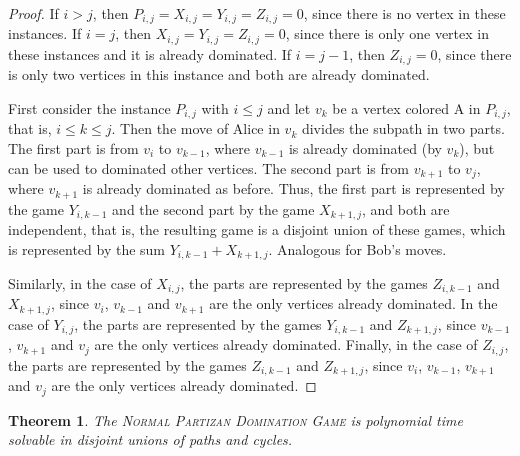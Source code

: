 \documentclass[12pt]{article}
\newtheorem{theorem}{Theorem}[section]
\begin{document}
\begin{proof}
If $i>j$, then $P_{i,j}=X_{i,j}=Y_{i,j}=Z_{i,j}=0$, since there is no vertex in these instances.
If $i=j$, then $X_{i,j}=Y_{i,j}=Z_{i,j}=0$, since there is only one vertex in these instances and it is already dominated.
If $i=j-1$, then $Z_{i,j}=0$, since there is only two vertices in this instance and both are already dominated.

First consider the instance $P_{i,j}$ with $i\leq j$ and let $v_k$ be a vertex colored A in $P_{i,j}$, that is, $i\leq k\leq j$. Then the move of Alice in $v_k$ divides the subpath in two parts. The first part is from $v_i$ to $v_{k-1}$, where $v_{k-1}$ is already dominated (by $v_k$), but can be used to dominated other vertices. The second part is from $v_{k+1}$ to $v_j$, where $v_{k+1}$ is already dominated as before. Thus, the first part is represented by the game $Y_{i,k-1}$ and the second part by the game $X_{k+1,j}$, and both are independent, that is, the resulting game is a disjoint union of these games, which is represented by the sum $Y_{i,k-1}+X_{k+1,j}$. Analogous for Bob's moves.

Similarly, in the case of $X_{i,j}$, the parts are represented by the games $Z_{i,k-1}$ and $X_{k+1,j}$, since $v_i$, $v_{k-1}$ and $v_{k+1}$ are the only vertices already dominated.
In the case of $Y_{i,j}$, the parts are represented by the games $Y_{i,k-1}$ and $Z_{k+1,j}$, since $v_{k-1}$, $v_{k+1}$ and $v_j$ are the only vertices already dominated.
Finally, in the case of $Z_{i,j}$, the parts are represented by the games $Z_{i,k-1}$ and $Z_{k+1,j}$, since $v_i$, $v_{k-1}$, $v_{k+1}$ and $v_j$ are the only vertices already dominated.
\end{proof}



\begin{theorem}
The \textsc{Normal Partizan Domination Game} is polynomial time solvable in disjoint unions of paths and cycles.
\end{theorem}
\end{document}
